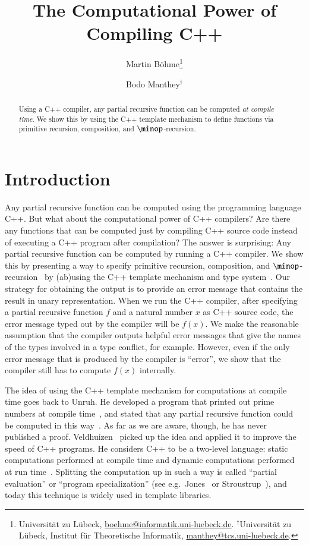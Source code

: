 \documentclass[final]{beatcs}
\title{The Computational Power of Compiling C++}
\author{Martin B\"ohme\thanks{Universit\"at zu L\"ubeck,
		\url{
			boehme@informatik.uni-luebeck.de}.\;
		$^\dagger$Universit\"at zu L\"ubeck, Institut f\"ur Theoretische Informatik,
		\url{
			manthey@tcs.uni-luebeck.de}.
	}
	\and Bodo Manthey$^\dagger$
}
\date{}
\begin{document}
\maketitle


\begin{abstract}
Using a C++ compiler, any partial recursive function can be computed \emph{at
	compile time}. We show this by using the C++ template mechanism to define 
functions via primitive recursion, composition, and $\minop$-recursion.
\end{abstract}

\section{Introduction}
Any partial recursive function can be computed using the programming language
C++. But what about the computational power of C++ compilers? Are there any 
functions that can be computed just by compiling C++ source code instead
of executing a C++ program after compilation? 
The answer is surprising: Any partial recursive
function can be computed by running a C++ compiler.
We show this by presenting a way to specify 
primitive recursion, composition, and 
$\minop$-recursion~\cite{Smith:Recursive:1994} by (ab)using the C++ template
mechanism and type system~\cite{Stroustrup:CPP:1997}.
Our strategy for obtaining the output is to provide an error message that
contains the result in unary representation.
When we run the C++ compiler, after specifying a partial recursive 
function $f$ and a natural number $x$ as C++ source code, 
the error message typed out by the compiler will be $f(x)$.
We make the reasonable assumption that the compiler outputs helpful error
messages that give the names of the types involved in a type conflict, for
example.
However, even if the only error message that is produced by the compiler 
is ``error'', we show that the compiler still has to compute $f(x)$ internally.

The idea of using the C++ template mechanism for computations at compile time
goes back to
Unruh. He developed a program that printed out prime
numbers
at compile time~\cite{Unruh:Prime}, 
and stated that any partial recursive function could be 
computed in this way~\cite{Unruh:WWW:2002}.
As far as we are aware, though, he has never published a proof.
Veldhuizen~\cite{Veldhuizen:TemplateMeta:1995} picked up the idea and 
applied it
to improve the speed of C++ programs. 
He considers C++ to be a two-level language: 
static computations performed at compile time and dynamic computations
performed at run time~\cite{Veldhuizen:Partial:1999}. 
Splitting the computation up in such a way is called 
``partial evaluation'' or ``program
specialization'' (see e.g.\ Jones~\cite{Jones:Partial:1996}
or Stroustrup~\cite[Sec.~13.5]{Stroustrup:CPP:1997}), and today this technique
is widely used in template libraries.
\end{document}
